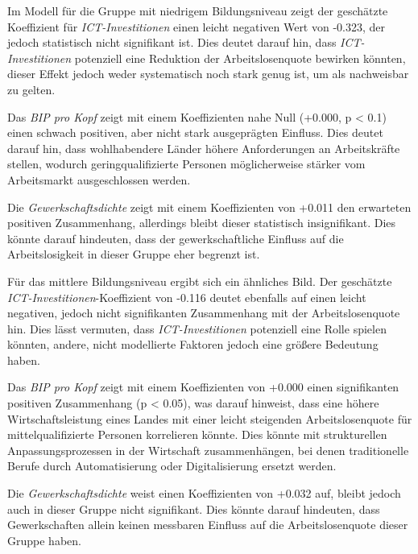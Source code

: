 

Im Modell für die Gruppe mit niedrigem Bildungsniveau zeigt der geschätzte Koeffizient für 
\textit{\ac{ICT}-Investitionen} einen leicht negativen Wert von -0.323, der jedoch 
statistisch nicht signifikant ist. Dies deutet darauf hin, dass \textit{\ac{ICT}-Investitionen} 
potenziell eine Reduktion der Arbeitslosenquote bewirken könnten, dieser Effekt jedoch weder 
systematisch noch stark genug ist, um als nachweisbar zu gelten. 

Das \textit{\ac{BIP} pro Kopf} zeigt mit einem Koeffizienten nahe Null (+0.000, p < 0.1) 
einen schwach positiven, aber nicht stark ausgeprägten Einfluss. Dies deutet darauf hin, dass 
wohlhabendere Länder höhere Anforderungen an Arbeitskräfte stellen, wodurch geringqualifizierte 
Personen möglicherweise stärker vom Arbeitsmarkt ausgeschlossen werden. 

Die \textit{Gewerkschaftsdichte} zeigt mit einem Koeffizienten von +0.011 den erwarteten 
positiven Zusammenhang, allerdings bleibt dieser statistisch insignifikant. Dies könnte 
darauf hindeuten, dass der gewerkschaftliche Einfluss auf die Arbeitslosigkeit in dieser Gruppe 
eher begrenzt ist.

Für das mittlere Bildungsniveau ergibt sich ein ähnliches Bild. Der geschätzte 
\textit{\ac{ICT}-Investitionen}-Koeffizient von -0.116 deutet ebenfalls auf einen 
leicht negativen, jedoch nicht signifikanten Zusammenhang mit der Arbeitslosenquote hin. Dies 
lässt vermuten, dass \textit{\ac{ICT}-Investitionen} potenziell eine Rolle spielen könnten, 
andere, nicht modellierte Faktoren jedoch eine größere Bedeutung haben. 

Das \textit{\ac{BIP} pro Kopf} zeigt mit einem Koeffizienten von +0.000 einen signifikanten 
positiven Zusammenhang (p < 0.05), was darauf hinweist, dass eine höhere Wirtschaftsleistung 
eines Landes mit einer leicht steigenden Arbeitslosenquote für mittelqualifizierte Personen 
korrelieren könnte. Dies könnte mit strukturellen Anpassungsprozessen in der Wirtschaft 
zusammenhängen, bei denen traditionelle Berufe durch Automatisierung oder Digitalisierung 
ersetzt werden.

Die \textit{Gewerkschaftsdichte} weist einen Koeffizienten von +0.032 auf, bleibt jedoch auch 
in dieser Gruppe nicht signifikant. Dies könnte darauf hindeuten, dass Gewerkschaften 
allein keinen messbaren Einfluss auf die Arbeitslosenquote dieser Gruppe haben.

